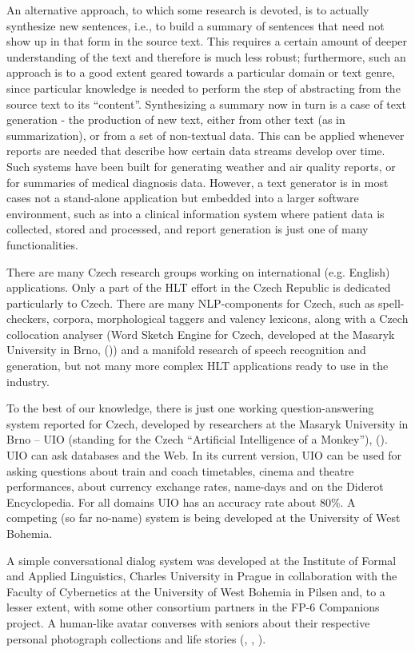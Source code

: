 \documentclass[]{../../metanetpaper}
\begin{document}
\begin{multicols}{2}
An alternative approach, to which some research is devoted, is to actually synthesize new sentences, i.e., to build a summary of sentences that need not show up in that form in the source text. This requires a certain amount of deeper understanding of the text and therefore is much less robust; furthermore, such an approach is to a good extent geared towards a particular domain or text genre, since particular knowledge is needed to perform the step of abstracting from the source text to its “content”. Synthesizing a summary now in turn is a case of text generation - the production of new text, either from other text (as in summarization), or from a set of non-textual data. This can be applied whenever reports are needed that describe how certain data streams develop over time. Such systems have been built for generating weather and air quality reports, or for summaries of medical diagnosis data. However, a text generator is in most cases not a stand-alone application but embedded into a larger software environment, such as into a clinical information system where patient data is collected, stored and processed, and report generation is just one of many functionalities.

There are many Czech research groups working on international (e.g. English) applications. Only a part of the HLT effort in the Czech Republic is dedicated particularly to Czech. There are many NLP-components for Czech, such as spell-checkers, corpora, morphological taggers and valency lexicons, along with a Czech collocation analyser (Word Sketch Engine for Czech, developed at the Masaryk University in Brno, (\cite{Horak2009})) and a manifold research of speech recognition and generation, but not many more complex HLT applications ready to use in the industry.

To the best of our knowledge, there is just one working question-answering system reported for Czech, developed by researchers at the Masaryk University in Brno – UIO (standing for the Czech “Artificial Intelligence of a Monkey”), (\cite{Svoboda2003}). UIO can ask databases and the Web. In its current version, UIO can be used for asking questions about train and coach timetables, cinema and theatre performances, about currency exchange rates, name-days and on the Diderot Encyclopedia. For all domains UIO has an accuracy rate about 80\%. A competing (so far no-name) system is being developed at the University of West Bohemia.

A simple conversational dialog system was developed at the Institute of Formal and Applied Linguistics, Charles University in Prague in collaboration with the Faculty of Cybernetics at the University of West Bohemia in Pilsen and, to a lesser extent, with some other consortium partners in the FP-6 Companions project\cite{Note21}. A human-like avatar converses with seniors about their respective personal photograph collections and life stories (\cite{Ptacek2010}, \cite{Romportl2010}, \cite{GruberTihelka2010}).


\end{multicols}
\end{document}
